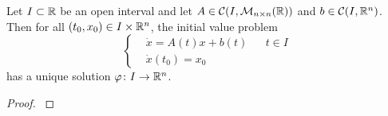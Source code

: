 \begin{theorem} \label{teo:linear_ode}
	Let $I \subset \mathbb{R}$ be an open interval and let $A \in \mathcal{C}(I,
	\mathcal{M}_{n \times n}(\mathbb{R}))$ and $b \in \mathcal{C}(I, \mathbb{R}^n)$. Then
	for all $(t_0, x_0) \in I \times \mathbb{R}^n$, the initial value problem
	\begin{equation}
		\left\{
			\begin{aligned}
				&\dot{x} = A(t) x + b(t) & &t \in I \\
				&\dot{x}(t_0) = x_0
			\end{aligned}
		\right.
	\end{equation}
	has a unique solution $\varphi \colon I \rightarrow \mathbb{R}^n$.
\end{theorem}
\begin{proof}
	\cite{pau2020ode}
\end{proof}

